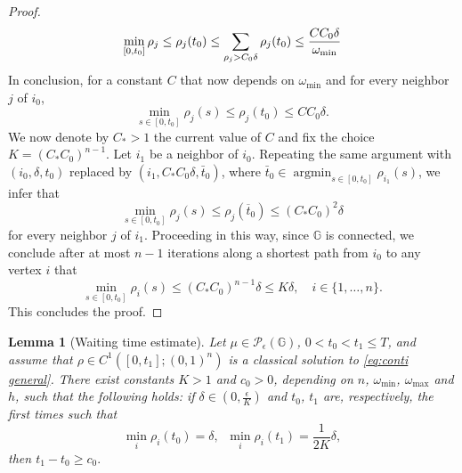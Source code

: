 \documentclass[10pt]{article}
\newtheorem{lemma}[theorem]{Lemma}
\numberwithin{equation}{section}
\newcommand{\cP}{ \mathcal{P}}
\newcommand{\bG}{\mathbb G}
\def\G{\mathbb{G}}
\begin{document}
\begin{proof}
\[
 \min_{[0,t_0]}\rho_j \leq \rho_j(t_0) \leq  \sum_{\rho_j>C_0\delta} \rho_j(t_0) \leq {CC_0\delta \over \omega_{\min}}
\]
In conclusion, for a constant $C$ that now depends on $\omega_{\min}$ and for every neighbor $j$ of $i_0$, 
\[
\min_{s\in[0,t_0]}\rho_j(s) \leq \rho_j(t_0)\leq CC_0\delta.
\] 
We now denote by $C_*>1$ the current value of $C$ and fix the choice $K=(C_*C_0)^{n-1}$. Let $i_1$ be a neighbor of $i_0$. Repeating the same argument with $(i_0,\delta,t_0)$ replaced by $(i_1,C_*C_0\delta, \bar{t}_0)$, where $\bar{t}_0\in\operatorname{argmin}_{s\in[0,t_0]}\rho_{i_1}(s)$, we infer that
\[\min_{s\in[0,t_0]}\rho_j(s) \leq \rho_j(\overline{t}_0)\leq(C_*C_0)^2\delta\] for every neighbor $j$ of $i_1$. Proceeding in this way, since $\G$ is connected, we conclude after at most $n-1$ iterations along a shortest path from $i_0$ to any vertex $i$ that
\[    \min_{s\in[0,t_0]}\rho_i(s) \leq (C_*C_0)^{n-1}\delta\leq K\delta, \quad i\in\{1,\ldots,n\}.\]
This concludes the proof. \end{proof}
\begin{lemma}[Waiting time estimate] \label{lem:interiority 2} Let $\mu \in \cP_\epsilon(\bG)$, $0< t_0<t_1\leq T$, and assume that $\rho\in C^1([0,t_1]; (0,1)^n)$ is a classical solution to \eqref{eq:conti general}.  There exist constants $K>1$ and $c_0>0$, depending on $n$, $\omega_{\min}$, $\omega_{\max}$ and $h$, such that the following holds: if $\delta \in (0,\frac{\epsilon}{K})$ and $t_0$, $t_1$ are, respectively, the  first times such that
\begin{equation}
    \min_{i}\rho_i(t_0)=\delta, \;\;\min_{i}\rho_i(t_1)=\frac{1}{2K}\delta, 
\end{equation}
then $t_1-t_0\geq c_0.$
\end{lemma}
\end{document}
